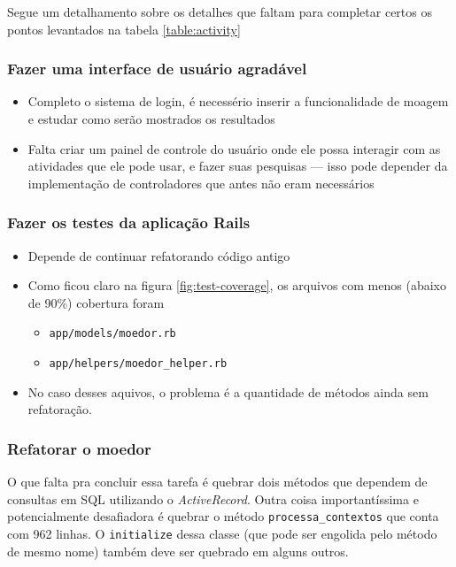 Segue um detalhamento sobre os detalhes que faltam para completar certos os pontos levantados na tabela \ref{table:activity}

\subsubsection{Fazer uma interface de usuário agradável}

\begin{itemize}
  \item Completo o sistema de login, é necessério inserir a funcionalidade de moagem e estudar como serão mostrados os
  resultados
  \item Falta criar um painel de controle do usuário onde ele possa interagir com as atividades que ele pode usar, e fazer
  suas pesquisas --- isso pode depender da implementação de controladores que antes não eram necessários
\end{itemize}

\subsubsection{Fazer os testes da aplicação Rails}

\begin{itemize}
  \item Depende de continuar refatorando código antigo
  \item Como ficou claro na figura \ref{fig:test-coverage}, os arquivos com menos (abaixo de 90\%) cobertura foram
  \begin{itemize}
    \item \texttt{app/models/moedor.rb}
    \item \texttt{app/helpers/moedor\_helper.rb}
  \end{itemize}
  \item No caso desses aquivos, o problema é a quantidade de métodos ainda sem refatoração.
\end{itemize}

\subsubsection{Refatorar o moedor}

O que falta pra concluir essa tarefa é quebrar dois métodos que dependem de consultas em SQL utilizando o
\emph{ActiveRecord}. Outra coisa importantíssima e potencialmente desafiadora é quebrar o método
\texttt{processa\_contextos} que conta com 962 linhas. O \texttt{initialize}  dessa classe (que pode ser engolida pelo
método de mesmo nome) também deve ser quebrado em alguns outros.

